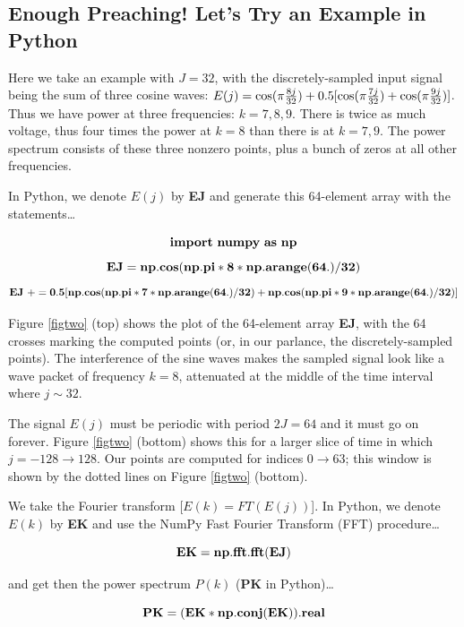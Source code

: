 \documentclass[11pt,preprint]{aastex}
\begin{document}
\subsection{ Enough Preaching! Let's Try an Example in Python}

	Here we take an example with $J=32$, with the discretely-sampled
input signal being the sum of three cosine waves: $E(j) = \cos(\pi {8j
\over 32}) + 0.5[\cos(\pi {7j \over 32}) + \cos(\pi {9j \over 32})]$. 
Thus we have power at three frequencies: $k=7, 8, 9$.  There is twice as
much voltage, thus four times the power at $k=8$ than there is at $k=7,
9$.  The power spectrum consists of these three nonzero points, plus a
bunch of zeros at all other frequencies.

 In Python, we denote $E(j)$ by {\bf EJ} and generate this
64-element array with the statements\dots

\begin{mathletters} \begin{equation} \bf{ import~numpy~as~np} \end{equation}
 \begin{equation}
 \bf{ EJ = np.cos(np.pi * 8 * np.arange(64.)/32) }
\end{equation} \begin{equation} \bf{ EJ~+= 0.5[np.cos(np.pi * 7
* np.arange(64.)/32) + np.cos(np.pi * 9 * np.arange(64.)/32) ] }
\end{equation}
\end{mathletters}

\noindent Figure \ref{figtwo} (top) shows the plot of the 64-element
array {\bf EJ}, with the 64 crosses marking the computed points (or, in
our parlance, the discretely-sampled points).  The interference of the
sine waves makes the sampled signal look like a wave packet of frequency
$k=8$, attenuated at the middle of the time interval where $j \sim 32$. 

	The signal $E(j)$ must be periodic with period $2J = 64$ and it
must go on forever.  Figure \ref{figtwo} (bottom) shows this for a
larger slice of time in which $j = -128 \rightarrow 128$.  Our points
are computed for indices $0 \rightarrow 63$; this window is shown by
the dotted lines on Figure \ref{figtwo} (bottom). 

 We take the Fourier transform [$E(k) = FT( E(j))$].  In Python, we
denote $E(k)$ by {\bf EK} and use the NumPy Fast Fourier Transform (FFT)
procedure\dots

\begin{mathletters}
\begin{equation}
{\bf EK = np.fft.fft(EJ)}
\end{equation}

\noindent and get then the power spectrum $P(k)$ ({\bf PK} in Python)\dots

\begin{equation}
{\bf PK = (EK * np.conj(EK)).real}
\end{equation}
\end{mathletters}
\end{document}

